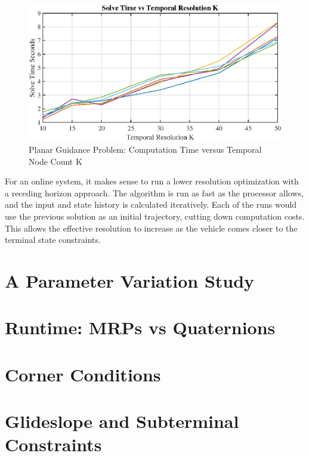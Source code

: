 \begin{figure}[!htbp] 
\label{}
  \centering
  \includegraphics[width=\textwidth]{figs/solvetimevsK.eps}
  \caption{Planar Guidance Problem: Computation Time versus Temporal Node Count K}
  \label{fig:solvetimes}
\end{figure}


For an online system, it makes sense to run a lower resolution optimization with a receding horizon approach. The algorithm is run as fast as the processor allows, and the input and state history is calculated iteratively. Each of the runs would use the previous solution as an initial trajectory, cutting down computation costs. This allows the effective resolution to increase as the vehicle comes closer to the terminal state constraints.


\section{A Parameter Variation Study}

\section{Runtime: MRPs vs Quaternions}

\section{Corner Conditions}

\section{Glideslope and Subterminal Constraints}


